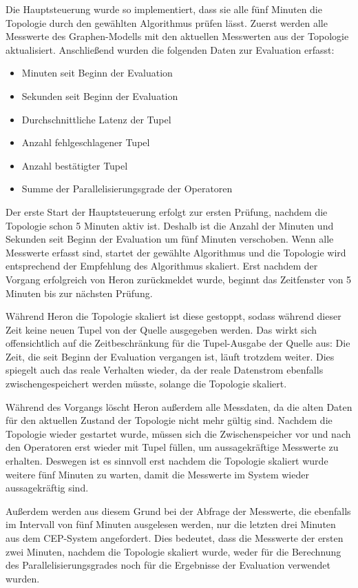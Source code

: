 Die Hauptsteuerung wurde so implementiert, dass sie alle fünf Minuten die Topologie durch den gewählten Algorithmus prüfen lässt.
Zuerst werden alle Messwerte des Graphen-Modells mit den aktuellen Messwerten aus der Topologie aktualisiert.
Anschließend wurden die folgenden Daten zur Evaluation erfasst:
\begin{itemize}
\item{Minuten seit Beginn der Evaluation}
\item{Sekunden seit Beginn der Evaluation}
\item{Durchschnittliche Latenz der Tupel}
\item{Anzahl fehlgeschlagener Tupel}
\item{Anzahl bestätigter Tupel}
\item{Summe der Parallelisierungsgrade der Operatoren}
\end{itemize}
Der erste Start der Hauptsteuerung erfolgt zur ersten Prüfung, nachdem die Topologie schon 5 Minuten aktiv ist.
Deshalb ist die Anzahl der Minuten und Sekunden seit Beginn der Evaluation um fünf Minuten verschoben.
Wenn alle Messwerte erfasst sind, startet der gewählte Algorithmus und die Topologie wird entsprechend der Empfehlung des Algorithmus skaliert.
Erst nachdem der Vorgang erfolgreich von Heron zurückmeldet wurde, beginnt das Zeitfenster von 5 Minuten bis zur nächsten Prüfung.

Während Heron die Topologie skaliert ist diese gestoppt, sodass während dieser Zeit keine neuen Tupel von der Quelle ausgegeben werden.
Das wirkt sich offensichtlich auf die Zeitbeschränkung für die Tupel-Ausgabe der Quelle aus: 
Die Zeit, die seit Beginn der Evaluation vergangen ist, läuft trotzdem weiter.
Dies spiegelt auch das reale Verhalten wieder, da der reale Datenstrom ebenfalls zwischengespeichert werden müsste, solange die Topologie skaliert.

Während des Vorgangs löscht Heron außerdem alle Messdaten, da die alten Daten für den aktuellen Zustand der Topologie nicht mehr gültig sind.
Nachdem die Topologie wieder gestartet wurde, müssen sich die Zwischenspeicher vor und nach den Operatoren erst wieder mit Tupel füllen, um aussagekräftige Messwerte zu erhalten.
Deswegen ist es sinnvoll erst nachdem die Topologie skaliert wurde weitere fünf Minuten zu warten, damit die Messwerte im System wieder aussagekräftig sind.

Außerdem werden aus diesem Grund bei der Abfrage der Messwerte, die ebenfalls im Intervall von fünf Minuten ausgelesen werden, nur die letzten drei Minuten aus dem CEP-System angefordert.
Dies bedeutet, dass die Messwerte der ersten zwei Minuten, nachdem die Topologie skaliert wurde, weder für die Berechnung des Parallelisierungsgrades noch für die Ergebnisse der Evaluation verwendet wurden.

